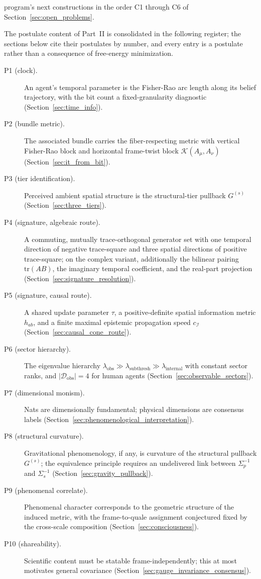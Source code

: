 \documentclass[11pt]{article}
\begin{document}
program's next constructions in the order C1 through C6 of Section~\ref{sec:open_problems}.

The postulate content of Part~II is consolidated in the following register; the sections below cite their postulates by number, and every entry is a postulate rather than a consequence of free-energy minimization.
\begin{description}
\item[P1 (clock).] An agent's temporal parameter is the Fisher-Rao arc length along its belief trajectory, with the bit count a fixed-granularity diagnostic (Section~\ref{sec:time_info}).
\item[P2 (bundle metric).] The associated bundle carries the fiber-respecting metric with vertical Fisher-Rao block and horizontal frame-twist block $\mathcal{K}(A_\mu, A_\nu)$ (Section~\ref{sec:it_from_bit}).
\item[P3 (tier identification).] Perceived ambient spatial structure is the structural-tier pullback $G^{(s)}$ (Section~\ref{sec:three_tiers}).
\item[P4 (signature, algebraic route).] A commuting, mutually trace-orthogonal generator set with one temporal direction of negative trace-square and three spatial directions of positive trace-square; on the complex variant, additionally the bilinear pairing $\mathrm{tr}(AB)$, the imaginary temporal coefficient, and the real-part projection (Section~\ref{sec:signature_resolution}).
\item[P5 (signature, causal route).] A shared update parameter $\tau$, a positive-definite spatial information metric $h_{ab}$, and a finite maximal epistemic propagation speed $c_\mathcal{I}$ (Section~\ref{sec:causal_cone_route}).
\item[P6 (sector hierarchy).] The eigenvalue hierarchy $\lambda_{\text{obs}} \gg \lambda_{\text{subthresh}} \gg \lambda_{\text{internal}}$ with constant sector ranks, and $|\mathcal{D}_{\text{obs}}| = 4$ for human agents (Section~\ref{sec:observable_sectors}).
\item[P7 (dimensional monism).] Nats are dimensionally fundamental; physical dimensions are consensus labels (Section~\ref{sec:phenomenological_interpretation}).
\item[P8 (structural curvature).] Gravitational phenomenology, if any, is curvature of the structural pullback $G^{(s)}$; the equivalence principle requires an undelivered link between $\Sigma_p^{-1}$ and $\Sigma_s^{-1}$ (Section~\ref{sec:gravity_pullback}).
\item[P9 (phenomenal correlate).] Phenomenal character corresponds to the geometric structure of the induced metric, with the frame-to-quale assignment conjectured fixed by the cross-scale composition (Section~\ref{sec:consciousness}).
\item[P10 (shareability).] Scientific content must be statable frame-independently; this at most motivates general covariance (Section~\ref{sec:gauge_invariance_consensus}).
\end{description}
\end{document}
